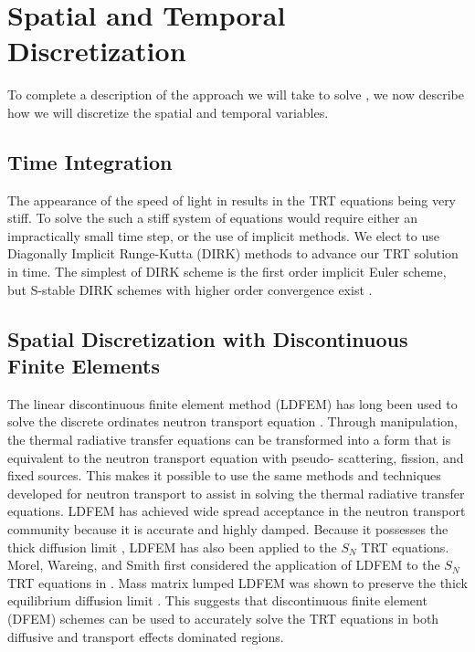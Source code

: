 \section{Spatial and Temporal Discretization}

To complete a description of the approach we will take to solve , we now describe how we will discretize the spatial and temporal variables.

\subsection{Time Integration}

The appearance of the speed of light in  results in the TRT equations being very stiff.
To solve the such a stiff system of equations would require either an impractically small time step, or the use of implicit methods.
We elect to use Diagonally Implicit Runge-Kutta (DIRK) methods to advance our TRT solution in time.
The simplest of DIRK scheme is the first order implicit Euler scheme, but S-stable DIRK schemes with higher order convergence exist \cite{alexander}.

\subsection{Spatial Discretization with Discontinuous Finite Elements}

The linear discontinuous finite element method (LDFEM) has long been used to solve the discrete ordinates neutron transport equation \cite{reed}.
Through manipulation, the thermal radiative transfer equations can be transformed  into a form that is equivalent to the neutron transport equation with pseudo- scattering, fission, and fixed sources.
This makes it possible to use the same methods and techniques developed for neutron transport to assist in solving the  thermal radiative transfer equations.
LDFEM has achieved wide spread acceptance in the neutron transport community because it is accurate \cite{larsen_nelson} and highly damped.  
Because it possesses the thick diffusion limit \cite{larsen_morel_asymptotics}, LDFEM has also been applied to the $S_N$ TRT equations.  
Morel, Wareing, and Smith first considered the application of LDFEM to the $S_N$ TRT equations in \cite{morel_radtran}.
Mass matrix lumped LDFEM was shown to preserve the thick equilibrium diffusion limit \cite{morel_radtran}.  
This suggests that discontinuous finite element (DFEM) schemes can be used to accurately solve the TRT equations in both diffusive and transport effects dominated regions.

